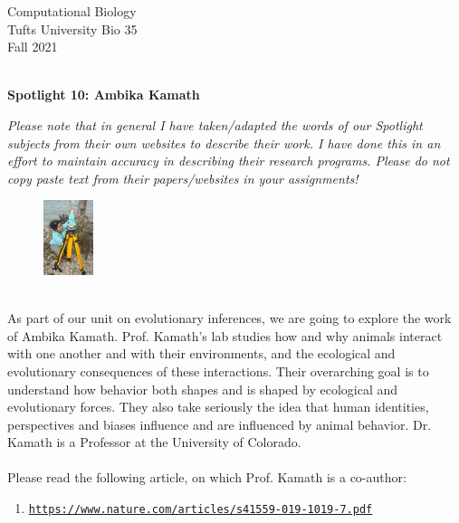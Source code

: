 \documentclass{article}
\begin{document}
\BeginAccSupp{}
\begin{flushright}
Computational Biology ~\\
Tufts University Bio 35 ~\\
Fall 2021 ~\\ ~\\
\end{flushright}
\begin{center}{\textbf{\Large{Spotlight 10: Ambika Kamath}}}\end{center}

\textit{Please note that in general I have taken/adapted the words of our Spotlight subjects from their own websites to describe their work. I have done this in an effort to maintain accuracy in describing their research programs. Please do not copy paste text from their papers/websites in your assignments!}

\begin{figure}
\begin{center}
 \includegraphics[width=0.13\textwidth]{images/ambika-kamath.jpeg}
 \end{center}
\end{figure}
~\\ As part of our unit on evolutionary inferences, we are going to explore the work of Ambika Kamath. Prof. Kamath's lab studies how and why animals interact with one another and with their environments, and the ecological and evolutionary consequences of these interactions. Their overarching goal is to understand how behavior both shapes and is shaped by ecological and evolutionary forces. They also take seriously the idea that human identities, perspectives and biases influence and are influenced by animal behavior. Dr. Kamath is a Professor at the University of Colorado.
~\\ ~\\

Please read the following article, on which Prof. Kamath is a co-author: 
\begin{enumerate}
\item \texttt{\href{https://www.nature.com/articles/s41559-019-1019-7.pdf}{https://www.nature.com/articles/s41559-019-1019-7.pdf}}
\end{enumerate}
\end{document}
